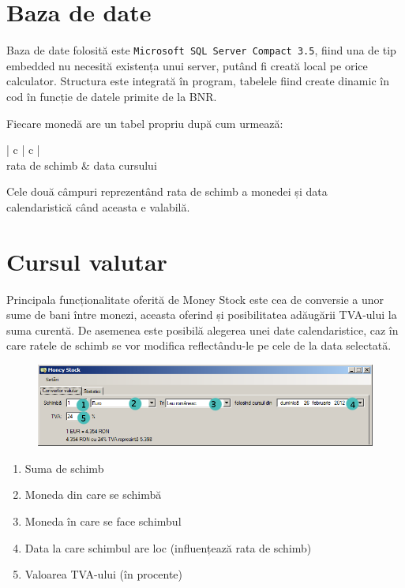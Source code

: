 \documentclass[13pt,a4paper]{report}
\begin{document}
\section{Baza de date}
Baza de date folosită este \texttt{Microsoft SQL Server Compact 3.5}, fiind una de
tip embedded nu necesită existența unui server, putând fi creată local pe orice
calculator.
Structura este integrată în program, tabelele fiind create dinamic în cod în
funcție de datele primite de la BNR.

Fiecare monedă are un tabel propriu după cum urmează:

\begin{center}
\begin{tabular}{| c | c |}
     \\ \hline
    rata de schimb & data cursului \\
    \hline
\end{tabular}
\end{center}

Cele două câmpuri reprezentând rata de schimb a monedei și data \\ 
calendaristică când aceasta e valabilă.

\section{Cursul valutar}
Principala funcționalitate oferită de Money Stock este cea de conversie a unor
sume de bani între monezi, aceasta oferind și posibilitatea adăugării TVA-ului la
suma curentă.
De asemenea este posibilă alegerea unei date calendaristice, caz în care ratele
de schimb se vor modifica reflectându-le pe cele de la data
selectată.

\begin{figure}[htb]
\centering
\includegraphics[width=1\textwidth]{img/ms.png}
\end{figure}

\begin{enumerate}
    \item Suma de schimb
    \item Moneda din care se schimbă
    \item Moneda în care se face schimbul
    \item Data la care schimbul are loc (influențează rata de schimb)
    \item Valoarea TVA-ului (în procente)
\end{enumerate}
\end{document}
